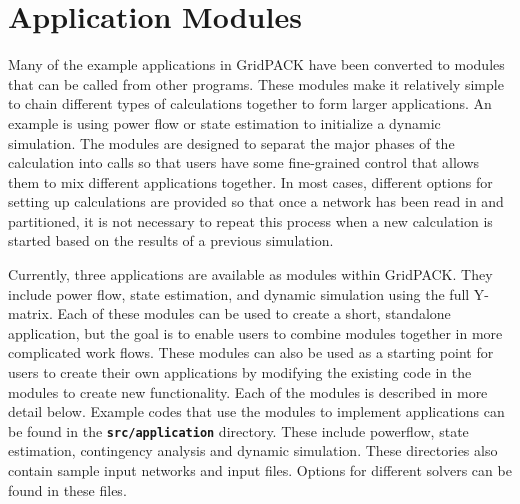 \chapter{Application Modules}

Many of the example applications in GridPACK have been converted to modules that can be called from other programs. These modules make it relatively simple to chain different types of calculations together to form larger applications. An example is using power flow or state estimation to initialize a dynamic simulation. The modules are designed to separat the major phases of the calculation into calls so that users have some fine-grained control that allows them to mix different applications together. In most cases, different options for setting up calculations are provided so that once a network has been read in and partitioned, it is not necessary to repeat this process when a new calculation is started based on the results of a previous simulation.

Currently, three applications are available as modules within GridPACK. They include power flow, state estimation, and dynamic simulation using the full Y-matrix. Each of these modules can be used to create a short, standalone application, but the goal is to enable users to combine modules together in more complicated work flows. These modules can also be used as a starting point for users to create their own applications by modifying the existing code in the modules to create new functionality. Each of the modules is described in more detail below. Example codes that use the modules to implement applications can be found in the \texttt{\textbf{src/application}} directory. These include powerflow, state estimation, contingency analysis and dynamic simulation. These directories also contain sample input networks and input files. Options for different solvers can be found in these files.
